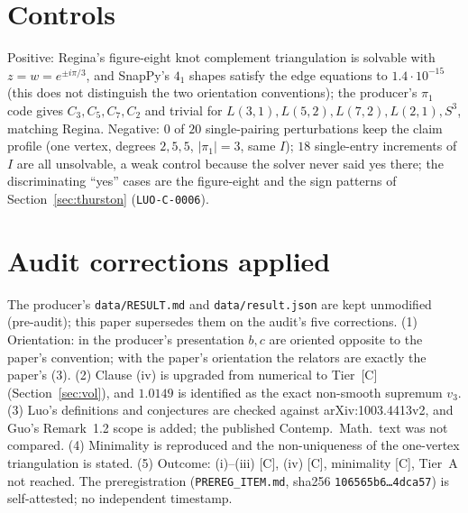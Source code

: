 \documentclass[10pt]{article}
\newcommand{\tier}[1]{\textsf{[#1]}}
\newcommand{\tC}{\tier{C}}
\begin{document}
\section{Controls}\label{sec:ctrl}
Positive: Regina's figure-eight knot complement triangulation is solvable with $z=w=e^{\pm i\pi/3}$, and SnapPy's $4_1$ shapes satisfy the edge equations to $1.4\cdot10^{-15}$ (this does not distinguish the two orientation conventions); the producer's $\pi_1$ code gives $C_3,C_5,C_7,C_2$ and trivial for $L(3,1),L(5,2),L(7,2),L(2,1),S^3$, matching Regina. Negative: $0$ of $20$ single-pairing perturbations keep the claim profile (one vertex, degrees $2,5,5$, $|\pi_1|=3$, same $I$); $18$ single-entry increments of $I$ are all unsolvable, a weak control because the solver never said yes there; the discriminating ``yes'' cases are the figure-eight and the sign patterns of Section~\ref{sec:thurston} (\texttt{LUO-C-0006}).

\section{Audit corrections applied}\label{sec:corr}
The producer's \texttt{data/RESULT.md} and \texttt{data/result.json} are kept unmodified (pre-audit); this paper supersedes them on the audit's five corrections. (1) Orientation: in the producer's presentation $b,c$ are oriented opposite to the paper's convention; with the paper's orientation the relators are exactly the paper's (3). (2) Clause (iv) is upgraded from numerical to Tier~\tC{} (Section~\ref{sec:vol}), and $1.0149$ is identified as the exact non-smooth supremum $v_3$. (3) Luo's definitions and conjectures are checked against arXiv:1003.4413v2, and Guo's Remark~1.2 scope is added; the published Contemp.\ Math.\ text was not compared. (4) Minimality is reproduced and the non-uniqueness of the one-vertex triangulation is stated. (5) Outcome: (i)--(iii) \tC{}, (iv) \tC{}, minimality \tC{}, Tier~A not reached. The preregistration (\texttt{PREREG\_ITEM.md}, sha256 \texttt{106565b6\dots 4dca57}) is self-attested; no independent timestamp.
\end{document}
